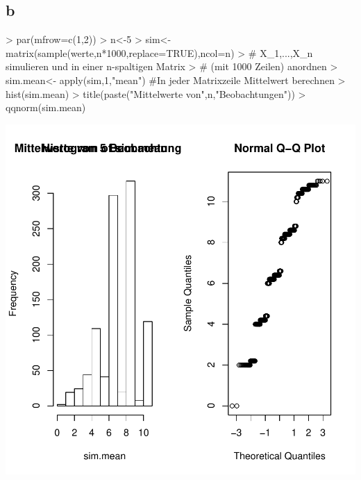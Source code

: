 \subsection{b}
\begin{Schunk}
\begin{Sinput}
> par(mfrow=c(1,2))
> n<-5
> sim<-matrix(sample(werte,n*1000,replace=TRUE),ncol=n)
> # X_1,...,X_n simulieren und in einer n-spaltigen Matrix
> # (mit 1000 Zeilen) anordnen
> sim.mean<- apply(sim,1,"mean") #In jeder Matrixzeile Mittelwert berechnen
> hist(sim.mean)
> title(paste("Mittelwerte von",n,"Beobachtungen"))
> qqnorm(sim.mean)
\end{Sinput}
\end{Schunk}
\includegraphics{sw08_4-002}

